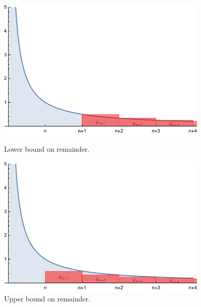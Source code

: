 \documentclass[letterpaper, 11pt, openany]{book}
\theoremstyle{mytheoremstyle}
\theoremstyle{myexamplestyle}
\begin{document}
\begin{figure}[htbp]
    \centering
    \begin{minipage}{0.45\textwidth}
        \centering
        \includegraphics[width=0.9\textwidth]{Figures/intttestremainderlb.pdf}
        \caption{Lower bound on remainder.}
        \label{f:intttestremainderlb}
    \end{minipage}\hfill
    \begin{minipage}{0.45\textwidth}
        \centering
        \includegraphics[width=0.9\textwidth]{Figures/intttestremainderub.pdf}
        \caption{Upper bound on remainder.}
        \label{f:intttestremainderub}
    \end{minipage}\hfill
\end{figure}
\end{document}
